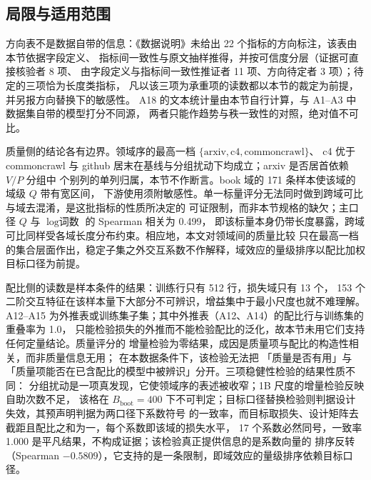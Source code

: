 \subsection{局限与适用范围}
\label{subsec:q1-limits}

方向表不是数据自带的信息：《数据说明》未给出 22 个指标的方向标注，该表由本节依据字段定义、
指标间一致性与原文抽样推得，并按可信度分层（证据可直接核验者 8 项、
由字段定义与指标间一致性推证者 11 项、方向待定者 3 项）；待定的三项恰为长度类指标，
凡以该三项为承重项的读数都以本节的裁定为前提，并另报方向替换下的敏感性。
A18 的文本统计量由本节自行计算，与 A1--A3 中数据集自带的模型打分不同源，
两者只能作趋势与秩一致性的对照，绝对值不可比。

质量侧的结论各有边界。领域序的最高一档 $\{\text{arxiv},\text{c4},\text{commoncrawl}\}$、
c4 优于 commoncrawl 与 github 居末在基线与分组扰动下均成立；arxiv 是否居首依赖 $V/P$ 分组中
个别列的单列归属，本节不作断言。book 域的 171 条样本使该域的域级 $Q$ 带有宽区间，
下游使用须附敏感性。单一标量评分无法同时做到跨域可比与域去混淆，是这批指标的性质所决定的
可证限制，而非本节规格的缺欠；主口径 $Q$ 与 $\log\text{词数}$ 的 Spearman 相关为 0.499，
即该标量本身仍带长度暴露，跨域可比同样受各域长度分布约束。相应地，本文对领域间的质量比较
只在最高一档的集合层面作出，稳定子集之外交互系数不作解释，域效应的量级排序以配比加权
目标口径为前提。

配比侧的读数是样本条件的结果：训练行只有 512 行，损失域只有 13 个，
153 个二阶交互特征在该样本量下大部分不可辨识，增益集中于最小尺度也就不难理解。
A12--A15 为外推表或训练集子集；其中外推表（A12、A14）的配比行与训练集的重叠率为 1.0，
只能检验损失的外推而不能检验配比的泛化，故本节未用它们支持任何定量结论。质量评分的
增量检验为零结果，成因是质量项与配比的构造性相关，而非质量信息无用；
在本数据条件下，该检验无法把
「质量是否有用」与「质量项能否在已含配比的模型中被辨识」分开。三项稳健性检验的结果性质不同：
分组扰动是一项真发现，它使领域序的表述被收窄；1B 尺度的增量检验反映自助次数不足，
该格在 $B_{\mathrm{boot}}=400$ 下不可判定；目标口径替换检验则判据设计失效，其预声明判据为两口径下系数符号
的一致率，而目标取损失、设计矩阵去截距且配比之和为一，每个系数即该域的损失水平，
17 个系数必然同号，一致率 1.000 是平凡结果，不构成证据；该检验真正提供信息的是系数向量的
排序反转（Spearman $-0.5809$），它支持的是一条限制，即域效应的量级排序依赖目标口径。
